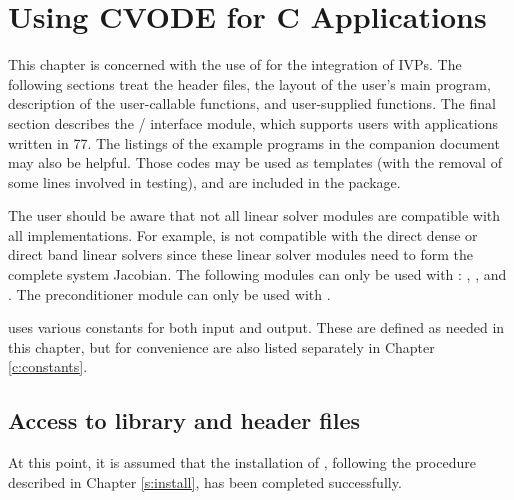 \chapter{Using CVODE for C Applications}\label{s:simulation}

This chapter is concerned with the use of {\cvode} for the integration
of IVPs.  The following sections treat the header files, the layout of
the user's main program, description of the {\cvode} user-callable
functions, and user-supplied functions.  The final section describes
the {\F}/{\C} interface module, which supports users with applications
written in {\F}77.  The listings of the example programs in the
companion document \cite{cvode2.4.0_ex} may also be helpful.  Those
codes may be used as templates (with the removal of some lines involved
in testing), and are included in the {\cvode} package.

The user should be aware that not all linear solver modules are compatible 
with all {\nvector} implementations. 
For example, {\nvecp} is not compatible with the direct dense or direct band 
linear solvers since these linear solver modules need to form the complete
system Jacobian.  The following {\cvode} modules can only be used with {\nvecs}:
{\cvdense}, {\cvband}, and {\cvbandpre}. The preconditioner module {\cvbbdpre}
can only be used with {\nvecp}.

{\cvode} uses various constants for both input and output.  These are
defined as needed in this chapter, but for convenience are also listed
separately in Chapter \ref{c:constants}.

\section{Access to library and header files}\label{ss:file_access}

At this point, it is assumed that the installation of {\cvode},
following the procedure described in Chapter \ref{s:install}, has
been completed successfully.

